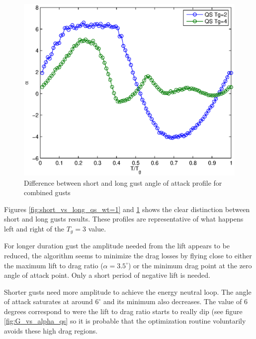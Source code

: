 \begin{figure}[h]
  \centering
  \includegraphics{./Figures/alpha_vs_Tg_QS_short_vs_long_wt3.eps}
  \caption{Difference between short and long gust angle of attack profile for combined gusts}
  \label{fig:short_vs_long_qs_wt=3}
\end{figure}

\par Figures \ref{fig:short_vs_long_qs_wt=1} and \ref{fig:short_vs_long_qs_wt=3} shows the clear distinction between short and long gusts results.
These profiles are representative of what happens left and right of the $T_g=3$ value.

\par For longer duration gust the amplitude needed from the lift appears to be reduced, the algorithm seems to minimize the drag losses by flying close to either the maximum lift to drag ratio ($\alpha = 3.5 ^{\circ}$) or the minimum drag point at the zero angle of attack point.
Only a short period of negative lift is needed.

\par Shorter gusts need more amplitude to achieve the energy neutral loop.
The angle of attack saturates at around $6^{\circ}$ and its minimum also decreases.
The value of 6 degrees correspond to were the lift to drag ratio starts to really dip (see figure \ref{fig:G_vs_alpha_qs} so it is probable that the optimization routine voluntarily avoids these high drag regions. 


\FloatBarrier
{}


